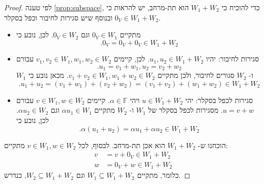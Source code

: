 \documentclass[12pt]{report}
\theoremstyle{plain}
\theoremstyle{definition}
\newcommand{\F}{\mathbb{F}}
\newcommand{\0}{\mathbf{0}}
\begin{document}
\begin{proof}
לפי טענה
\ref{prop:subspace},
כדי להוכיח כי
$W_1+W_2$
הוא תת-מרחב, יש להראות כי
$0_V\in W_1+W_2$
ובנוסף שיש סגירות לחיבור וכפל בסקלר.

\begin{itemize}
\item 
מתקיים
$0_V\in W_1$
וגם
$0_V\in W_2$.
לכן, נובע כי
$$
.0_V=0_V+0_V\in W_1+W_2
$$


\item
סגירות לחיבור: יהיו
$u_1,u_2\in W_1+W_2$.
לכן, קיימים
$
v_1,v_2\in W_1,w_1,w_2\in W_2
$
עבורם
$$
.u_1=v_1+w_1,u_2=v_2+w_2
$$
$W_1$
ו-
$W_2$
סגורים לחיבור, ולכן מתקיים
$v_1+v_2\in W_1, w_1+w_2\in W_2$.
מכאן נובע כי
$$
.u_1+u_2=(v_1+w_1)+(v_2+w_2)=(v_1+v_2)+(w_1+w_2)\in W_1+W_2
$$


\item
סגירות לכפל בסקלר: יהי 
$u\in W_1+W_2$
ויהי
$\alpha\in\F$.
קיימים
$v\in W_1, w\in W_2$
עבורם
$u=v+w$.
מסגירות לכפל בסקלר של 
$W_1$
ו-
$W_2$
מתקיים
$\alpha u_1\in W_1$
וגם
$\alpha u_2\in W_2$.
לכן, נובע כי
$$
.\alpha (u_1+u_2)=\alpha u_1+\alpha u_2\in W_1+W_2
$$


\end{itemize}


הוכחנו ש-
$W_1+W_2$
הוא אכן תת-מרחב. לבסוף, לכל 
$v\in W_1,w\in W_2$
מתקיים:
$$
\begin{aligned}
v&=v+0_V\in W_1+W_2 \\
w&=0_V+w\in W_1+W_2
\end{aligned}
$$
כלומר, מתקיים
$W_1\subseteq W_1+W_2$
וגם
$W_2\subseteq W_1+W_2$,
כנדרש.
\end{proof}
\end{document}
